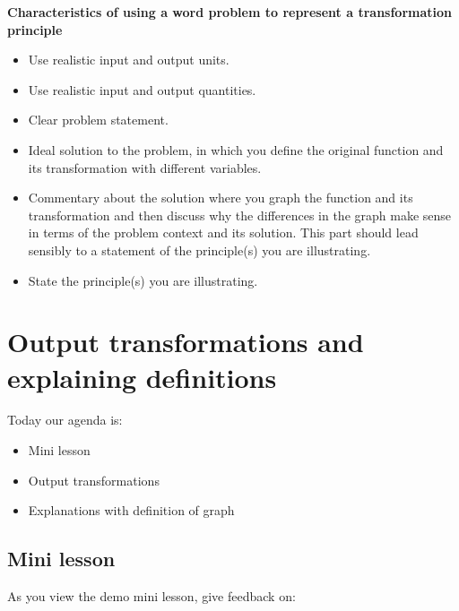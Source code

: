 \documentclass[11pt]{article}
\theoremstyle{definition}
\begin{document}
\begin{mdframed}
\begin{center} {\bf Characteristics of using a word problem to represent a transformation principle}\end{center}
	\begin{itemize}
	\item Use realistic input and output units.
	\item Use realistic input and output quantities.
	\item Clear problem statement.
	\item Ideal solution to the problem, in which you define the original function and its transformation with different variables.
	\item Commentary about the solution where you graph the function and its transformation and then discuss why the differences in the graph make sense in terms of the problem context and its solution. This part should lead sensibly to a statement of the principle(s) you are illustrating.
	\item State the principle(s) you are illustrating.
	\end{itemize}
\end{mdframed}

\newpage \section{Output transformations and explaining definitions}

Today our agenda is:

\begin{itemize}
\item Mini lesson
\item Output transformations
\item Explanations with definition of graph
\end{itemize}


\subsection*{Mini lesson}

As you view the demo mini lesson, give feedback on:
\end{document}

